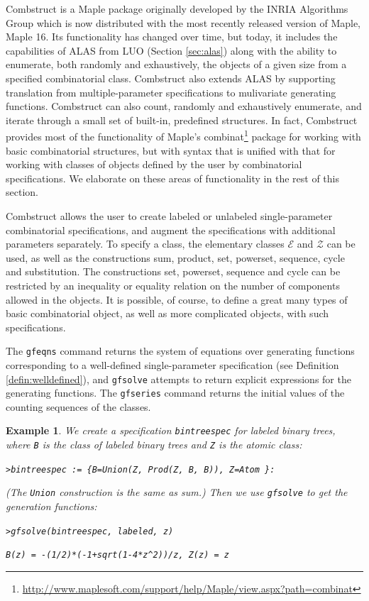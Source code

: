 \documentclass[12pt]{article}
\theoremstyle{plain}
\newtheorem{exa}{Example}
\newcommand{\codefont}[1]{{\fontshape{n}\texttt{#1}}}
\newenvironment{snippet}{\vspace{10px}\fontfamily{ppl}\selectfont}{\vspace{10px}}
\begin{document}
Combstruct is a Maple package
originally developed by the INRIA Algorithms Group
which is now distributed with the most recently released version of Maple, Maple 16.
Its functionality has changed over time, but
today, it includes the capabilities of ALAS from LUO (Section \ref{sec:alas}) along with the ability to enumerate, both randomly and exhaustively, the objects of a given size from a specified combinatorial class.
Combstruct also extends ALAS by supporting translation from multiple-parameter specifications to mulivariate generating functions.
Combstruct can also count, randomly and exhaustively enumerate, and iterate through
a small set of built-in, predefined structures.
In fact, Combstruct provides most of the functionality of Maple's combinat\footnote{
 \url{http://www.maplesoft.com/support/help/Maple/view.aspx?path=combinat}
} package for working with basic combinatorial structures, but with syntax that is unified with that for working with classes of objects defined by the user by combinatorial specifications.
We elaborate on these areas of functionality in the rest of this section.

Combstruct allows the user to create labeled or unlabeled single-parameter combinatorial specifications, and augment the specifications with additional parameters separately.
To specify a class, the elementary classes \( \mathcal{E} \) and \( \mathcal{Z} \) can be used, as well as the constructions
sum, product, set, powerset, sequence, cycle and substitution.
The constructions set, powerset, sequence and cycle can be restricted by an inequality or equality relation on the number of components allowed in the objects.
It is possible, of course, to define a great many types of basic combinatorial object, as well as more complicated objects, with such specifications.

The \codefont{gfeqns} command returns the system of equations over generating functions corresponding to a well-defined single-parameter specification (see Definition \ref{defin:welldefined}), and \codefont{gfsolve} attempts to return explicit expressions for the generating functions.
The \codefont{gfseries} command returns the initial values of the counting sequences of the classes.

\begin{exa}

We create a specification \codefont{bintreespec} for labeled binary trees, where \codefont{B} is the class of labeled binary trees and \codefont{Z} is the atomic class:

\begin{snippet}
\codefont{>bintreespec := \{B=Union(Z, Prod(Z, B, B)), Z=Atom \}:}
\end{snippet}

(The \codefont{Union} construction is the same as sum.)
Then we use \codefont{gfsolve} to get the generation functions:

\begin{snippet}
\codefont{>gfsolve(bintreespec, labeled, z)}

\codefont{{B(z) = -(1/2)*(-1+sqrt(1-4*z\^{}2))/z, Z(z) = z}}
\end{snippet}

\end{exa}
\end{document}
